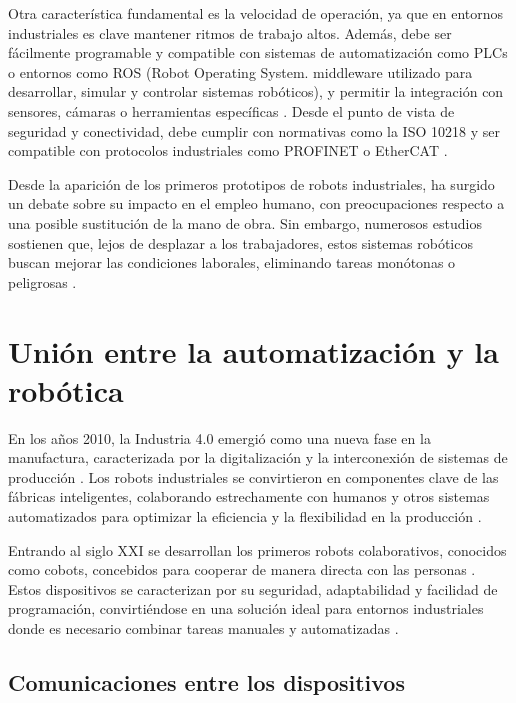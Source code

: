 Otra característica fundamental es la velocidad de operación, ya que en entornos industriales es clave mantener ritmos de trabajo altos. Además, debe ser fácilmente programable y compatible con sistemas de automatización como PLCs o entornos como ROS (Robot Operating System. middleware utilizado para desarrollar, simular y controlar sistemas robóticos), y permitir la integración con sensores, cámaras o herramientas específicas  \cite{brazo_industrial}. Desde el punto de vista de seguridad y conectividad, debe cumplir con normativas como la ISO 10218 y ser compatible con protocolos industriales como PROFINET o EtherCAT \cite{brazo_industrial}. 

Desde la aparición de los primeros prototipos de robots industriales, ha surgido un debate sobre su impacto en el empleo humano, con preocupaciones respecto a una posible sustitución de la mano de obra. Sin embargo, numerosos estudios sostienen que, lejos de desplazar a los trabajadores, estos sistemas robóticos buscan mejorar las condiciones laborales, eliminando tareas monótonas o peligrosas \cite{info_robotica_industrial_2}. 

\section{Unión entre la automatización y la robótica}
\label{sec:terceraseccion}

En los años 2010, la Industria 4.0 emergió como una nueva fase en la manufactura, caracterizada por la digitalización y la interconexión de sistemas de producción  \cite{intro_union}.  Los robots industriales se convirtieron en componentes clave de las fábricas inteligentes, colaborando estrechamente con humanos y otros sistemas automatizados para optimizar la eficiencia y la flexibilidad en la producción \cite{intro_union}. 

Entrando al siglo XXI se desarrollan los primeros robots colaborativos, conocidos como cobots, concebidos para cooperar de manera directa con las personas  \cite{intro_union}. Estos dispositivos se caracterizan por su seguridad, adaptabilidad y facilidad de programación, convirtiéndose en una solución ideal para entornos industriales donde es necesario combinar tareas manuales y automatizadas  \cite{intro_union}. 

\subsection{Comunicaciones entre los dispositivos}

